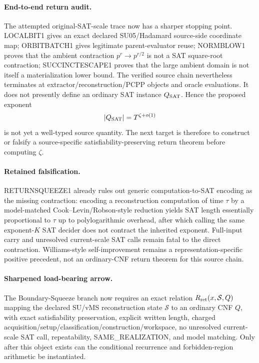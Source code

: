 \documentclass[11pt]{article}
\begin{document}
\paragraph{End-to-end return audit.}
The attempted original-SAT-scale trace now has a sharper stopping point. LOCALBIT1 gives an exact declared SU05/Hadamard source-side coordinate map; ORBITBATCH1 gives legitimate parent-evaluator reuse; NORMBLOW1 proves that the ambient contraction $p^r\to p^{r/2}$ is not a SAT square-root contraction; SUCCINCTESCAPE1 proves that the large ambient domain is not itself a materialization lower bound. The verified source chain nevertheless terminates at extractor/reconstruction/PCPP objects and oracle evaluations. It does not presently define an ordinary SAT instance $Q_{\rm SAT}$. Hence the proposed exponent
\[
|Q_{\rm SAT}|=T^{\zeta+o(1)}
\]
is not yet a well-typed source quantity. The next target is therefore to construct or falsify a source-specific satisfiability-preserving return theorem before computing $\zeta$.

\paragraph{Retained falsification.}
RETURNSQUEEZE1 already rules out generic computation-to-SAT encoding as the missing contraction: encoding a reconstruction computation of time $\tau$ by a model-matched Cook--Levin/Robson-style reduction yields SAT length essentially proportional to $\tau$ up to polylogarithmic overhead, after which calling the same exponent-$K$ SAT decider does not contract the inherited exponent. Full-input carry and unresolved current-scale SAT calls remain fatal to the direct contraction. Williams-style self-improvement remains a representation-specific positive precedent, not an ordinary-CNF return theorem for this source chain.

\paragraph{Sharpened load-bearing arrow.}
The Boundary-Squeeze branch now requires an exact relation $R_{\rm ret}(x,\mathcal S,Q)$ mapping the declared SU/vMS reconstruction state $\mathcal S$ to an ordinary CNF $Q$, with exact satisfiability preservation, explicit written length, charged acquisition/setup/classification/construction/workspace, no unresolved current-scale SAT call, repeatability, SAME\_REALIZATION, and model matching. Only after this object exists can the conditional recurrence and forbidden-region arithmetic be instantiated.
\end{document}
